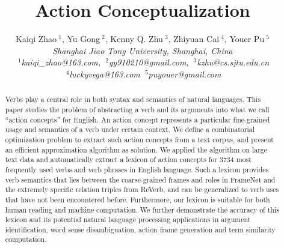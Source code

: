 \documentclass[10pt,conference,letterpaper]{IEEEtran}
\theoremstyle{definition}
\begin{document}
\title{Action Conceptualization}

%

\author{
{Kaiqi Zhao{\small $~^{1}$}, Yu Gong{\small $~^{2}$},
Kenny Q. Zhu{\small $~^{3}$}, Zhiyuan Cai{\small $~^{4}$},
Youer Pu{\small $~^{5}$}}%
\vspace{1.6mm}\\
\fontsize{10}{10}\selectfont\itshape
Shanghai Jiao Tong University, Shanghai, China\\
\fontsize{9}{9}\selectfont\ttfamily\upshape
$~^{1}$kaiqi\_zhao@163.com, $~^{2}$gy910210@gmail.com, $~^{3}$kzhu@cs.sjtu.edu.cn \\
$~^{4}$luckyvega@163.com $~^{5}$puyouer@gmail.com\\
}

\maketitle
\begin{abstract}
Verbs play a central role in both syntax and semantics of natural
languages. This paper studies the problem of abstracting a verb and
its arguments into what we call ``action concepts'' for English.
An action concept represents a particular fine-grained usage
and semantics of a verb under certain context. We define
a combinatorial optimization problem to extract such action concepts
from a text corpus, and present an efficient approximation
algorithm as solution. We applied the algorithm on large text data
and automatically extract a lexicon of action concepts for
3734 most frequently used verbs and verb phrases in English language.
Such a lexicon provides verb semantics that lies between
the coarse-grained frames and roles in FrameNet and the extremely
specific relation triples from ReVerb, and can be generalized to
verb uses that have not been encountered before. Furthermore,
our lexicon is suitable for both human reading and machine computation.
We further demonstrate the accuracy of this lexicon and its
potential natural language processing applications in
argument identification, word sense
disambiguation, action frame generation and term similarity
computation.
\end{abstract}

\end{document}
